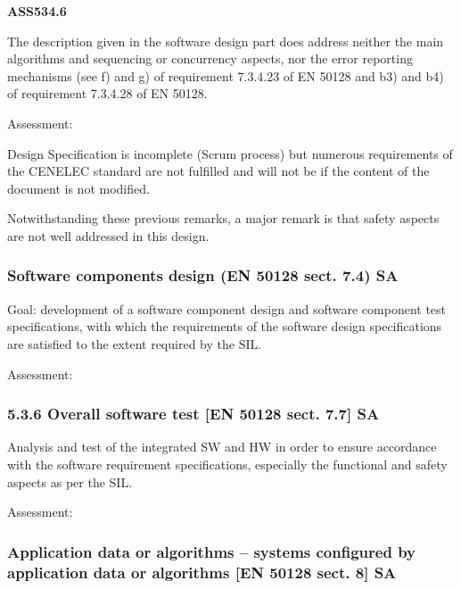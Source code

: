 \bigskip

{\bfseries
ASS534.6}

The description given in the software design part does address neither the main algorithms and sequencing or concurrency
aspects, nor the error reporting mechanisms (see f) and g) of requirement 7.3.4.23 of EN 50128 and b3) and b4) of
requirement 7.3.4.28 of EN 50128. 


\bigskip

Assessment:

Design Specification is incomplete (Scrum process) but numerous requirements of the CENELEC standard are not fulfilled
and will not be if the content of the document is not modified. 

Notwithstanding these previous remarks, a major remark is that safety aspects are not well addressed in this design.

\subsubsection{Software components design (EN 50128
sect. 7.4) SA}
Goal: development of a software component design and software component test specifications, with which the requirements
of the software design specifications are satisfied to the extent required by the SIL.


\bigskip


\bigskip

Assessment:


\bigskip


\bigskip

\subsubsection[5.3.6 Overall software test [EN 50128 sect. 7.7{]} SA]{5.3.6 Overall software test [EN 50128 sect. 7.7]
SA}
Analysis and test of the integrated SW and HW in order to ensure accordance with the software requirement
specifications, especially the functional and safety aspects as per the SIL.


\bigskip

Assessment:


\bigskip

\subsubsection{Application data or algorithms -- systems configured by application data or algorithms [EN 50128
sect. 8] SA}

